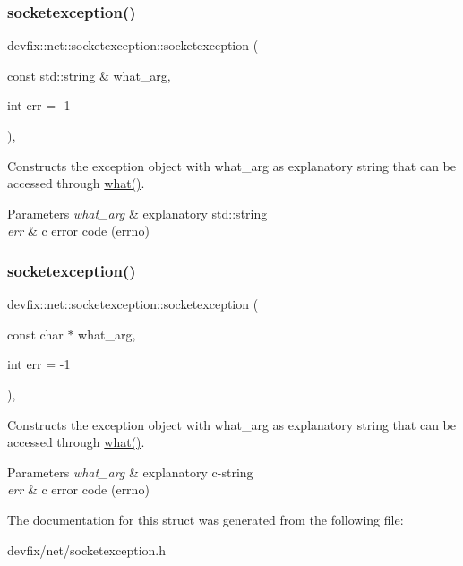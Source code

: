 \subsubsection{\texorpdfstring{socketexception()}{socketexception()}\hspace{0.1cm}{\footnotesize\ttfamily [1/2]}}
{\footnotesize\ttfamily devfix\+::net\+::socketexception\+::socketexception (\begin{DoxyParamCaption}\item[{const std\+::string \&}]{what\+\_\+arg,  }\item[{int}]{err = {\ttfamily -\/1} }\end{DoxyParamCaption})\hspace{0.3cm}{\ttfamily [inline]}, {\ttfamily [explicit]}}

Constructs the exception object with what\+\_\+arg as explanatory string that can be accessed through \hyperlink{structdevfix_1_1base_1_1baseexception_a10cc739c08d7d38b89abea342824396f}{what()}. 
\begin{DoxyParams}{Parameters}
{\em what\+\_\+arg} & explanatory std\+::string \\
\hline
{\em err} & c error code (errno) \\
\hline
\end{DoxyParams}
\mbox{\label{structdevfix_1_1net_1_1socketexception_a6da69f635eb11f932a0e960545d023bd}} 
\subsubsection{\texorpdfstring{socketexception()}{socketexception()}\hspace{0.1cm}{\footnotesize\ttfamily [2/2]}}
{\footnotesize\ttfamily devfix\+::net\+::socketexception\+::socketexception (\begin{DoxyParamCaption}\item[{const char $\ast$}]{what\+\_\+arg,  }\item[{int}]{err = {\ttfamily -\/1} }\end{DoxyParamCaption})\hspace{0.3cm}{\ttfamily [inline]}, {\ttfamily [explicit]}}

Constructs the exception object with what\+\_\+arg as explanatory string that can be accessed through \hyperlink{structdevfix_1_1base_1_1baseexception_a10cc739c08d7d38b89abea342824396f}{what()}. 
\begin{DoxyParams}{Parameters}
{\em what\+\_\+arg} & explanatory c-\/string \\
\hline
{\em err} & c error code (errno) \\
\hline
\end{DoxyParams}


The documentation for this struct was generated from the following file\+:\begin{DoxyCompactItemize}
\item 
devfix/net/socketexception.\+h\end{DoxyCompactItemize}
